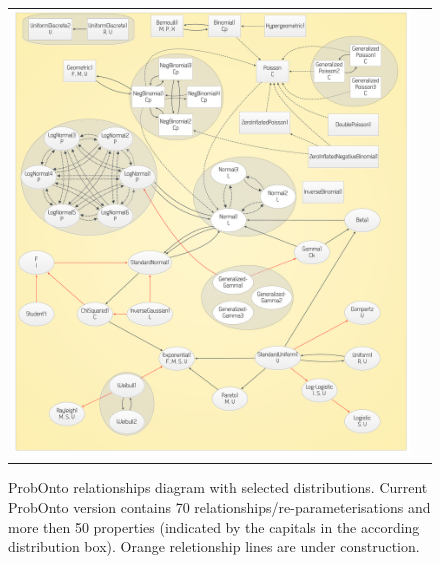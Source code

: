 \begin{figure}[htb!]
\centering
\begin{tabular}{cc}
 \includegraphics[width=160mm]{pics/POdiagram}
\end{tabular}
\caption{ProbOnto relationships diagram with selected distributions. 
Current ProbOnto version contains 70 relationships/re-parameterisations and 
more then 50 properties (indicated by the capitals in the according 
distribution box). Orange reletionship lines are under construction.}
\label{fig:POdiagram}
\end{figure}

